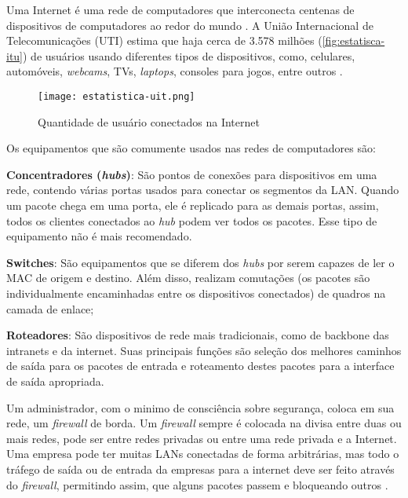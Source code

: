 Uma Internet é uma rede de computadores que interconecta centenas de dispositivos de computadores ao redor do mundo \cite{redes:kurose}. A União Internacional de Telecomunicações (UTI) estima que haja cerca de 3.578 milhões (\autoref{fig:estatisca-itu}) de usuários usando diferentes tipos de dispositivos, como, celulares, automóveis, \textit{webcams}, TVs, \textit{laptops}, consoles para jogos, entre outros \cite{estatistica:itu}.

\begin{figure}[htb]
    \centering
    \caption{Quantidade de usuário conectados na Internet} 
    \texttt{[image: estatistica-uit.png]}
    \label{fig:estatisca-itu}
\end{figure}

Os equipamentos que são comumente usados nas redes de computadores são:

\begin{alineas}
\item \textbf{Concentradores (\textit{hubs})}: São pontos de conexões para dispositivos em uma rede, contendo várias portas usados para conectar os segmentos da LAN. Quando um pacote chega em uma porta, ele é replicado para as demais portas, assim, todos os clientes conectados ao \textit{hub} podem ver todos os pacotes. Esse tipo de equipamento não é mais recomendado.
\item \textbf{Switches}: São equipamentos que se diferem dos \textit{hubs} por serem capazes de ler o MAC de origem e destino. Além disso, realizam comutações (os pacotes são individualmente encaminhadas entre os dispositivos conectados) de quadros na camada de enlace;
\item \textbf{Roteadores}: São dispositivos de rede mais tradicionais, como de backbone das intranets e da internet. Suas principais funções são seleção dos melhores caminhos de saída para os pacotes de entrada e roteamento destes pacotes para a interface de saída apropriada.
\end{alineas}

Um administrador, com o minimo de consciência sobre segurança, coloca em sua rede, um \textit{firewall} de borda. Um \textit{firewall} sempre é colocada na divisa entre duas ou mais redes, pode ser entre redes privadas ou entre uma rede privada e a Internet. Uma empresa pode ter muitas LANs conectadas de forma arbitrárias, mas todo o tráfego de saída ou de entrada da empresas para a internet deve ser feito através do \textit{firewall}, permitindo assim, que alguns pacotes passem e bloqueando outros \cite{redesdecomputadores}.

